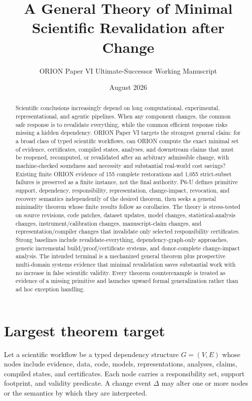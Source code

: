 \documentclass[11pt]{article}
\title{A General Theory of Minimal Scientific Revalidation after Change}
\author{ORION Paper VI Ultimate-Successor Working Manuscript}
\date{August 2026}
\begin{document}
\maketitle

\begin{abstract}
Scientific conclusions increasingly depend on long computational, experimental, representational, and agentic pipelines. When any component changes, the common safe response is to revalidate everything, while the common efficient response risks missing a hidden dependency. ORION Paper VI targets the strongest general claim: for a broad class of typed scientific workflows, can ORION compute the exact minimal set of evidence, certificates, compiled states, analyses, and downstream claims that must be reopened, recomputed, or revalidated after an arbitrary admissible change, with machine-checked soundness and necessity and substantial real-world cost savings? Existing finite ORION evidence of 155 complete restorations and 1,055 strict-subset failures is preserved as a finite instance, not the final authority. P6-U defines primitive support, dependency, responsibility, representation, change-impact, revocation, and recovery semantics independently of the desired theorem, then seeks a general minimality theorem whose finite results follow as corollaries. The theory is stress-tested on source revisions, code patches, dataset updates, model changes, statistical-analysis changes, instrument/calibration changes, manuscript-claim changes, and representation/compiler changes that invalidate only selected responsibility certificates. Strong baselines include revalidate-everything, dependency-graph-only approaches, generic incremental build/proof/certificate systems, and donor-complete change-impact analysis. The intended terminal is a mechanized general theorem plus prospective multi-domain systems evidence that minimal revalidation saves substantial work with no increase in false scientific validity. Every theorem counterexample is treated as evidence of a missing primitive and launches upward formal generalization rather than ad hoc exception handling.
\end{abstract}

\section{Largest theorem target}
Let a scientific workflow be a typed dependency structure $G=(V,E)$ whose nodes include evidence, data, code, models, representations, analyses, claims, compiled states, and certificates. Each node carries a responsibility set, support footprint, and validity predicate. A change event $\Delta$ may alter one or more nodes or the semantics by which they are interpreted.
\end{document}
